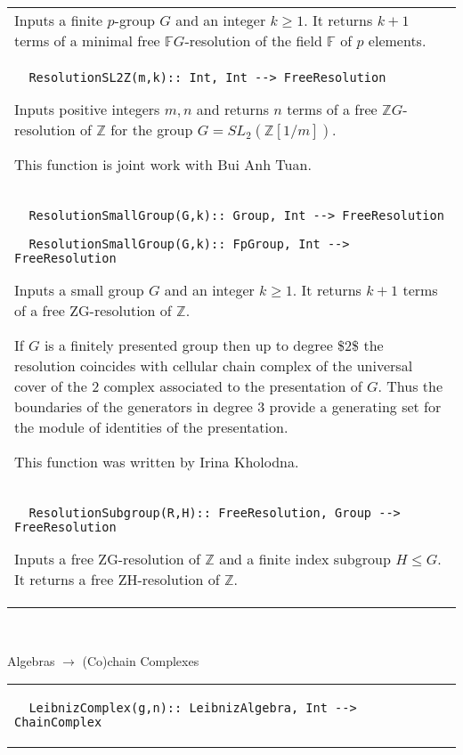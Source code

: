 \documentclass[a4paper,11pt]{report}
\begin{document}
{\begin{center}
\begin{tabular}{|l|}
 

 Inputs a finite $p$-group $G$ and an integer $k \ge 1$. It returns $k+1$ terms of a minimal free $\mathbb FG$-resolution of the field $\mathbb F$ of $p$ elements. \\
 \index{ResolutionSL2Z} 
\begin{verbatim}  ResolutionSL2Z(m,k):: Int, Int --> FreeResolution
\end{verbatim}
 Inputs positive integers $m, n$ and returns $n$ terms of a free $\mathbb ZG$-resolution of $\mathbb Z$ for the group $G=SL_2(\mathbb Z[1/m])$. 

 This function is joint work with Bui Anh Tuan. \\
 \index{ResolutionSmallGroup} 
\begin{verbatim}  ResolutionSmallGroup(G,k):: Group, Int --> FreeResolution
\end{verbatim}
 
\begin{verbatim}  ResolutionSmallGroup(G,k):: FpGroup, Int --> FreeResolution
\end{verbatim}
 

 Inputs a small group $G$ and an integer $k \ge 1$. It returns $k+1$ terms of a free ZG-resolution of $\mathbb Z$. 

 If $G$ is a finitely presented group then up to degree \$2\$ the resolution coincides
with cellular chain complex of the universal cover of the $2$ complex associated to the presentation of $G$. Thus the boundaries of the generators in degree $3$ provide a generating set for the module of identities of the presentation. 

 This function was written by Irina Kholodna. \\
 \index{ResolutionSubgroup} 
\begin{verbatim}  ResolutionSubgroup(R,H):: FreeResolution, Group --> FreeResolution
\end{verbatim}


 

 Inputs a free ZG-resolution of $\mathbb Z$ and a finite index subgroup $H \le G$. It returns a free ZH-resolution of $\mathbb Z$. \\
\end{tabular}\\[2mm]
\end{center}

 Algebras $\longrightarrow $ (Co)chain Complexes \begin{center}
\begin{tabular}{|l|} \index{LeibnizComplex} 
\begin{verbatim}  LeibnizComplex(g,n):: LeibnizAlgebra, Int --> ChainComplex
\end{verbatim}
 


\end{tabular}
\end{center}}
\end{document}
